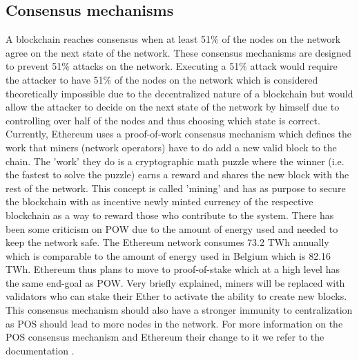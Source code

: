\documentclass[sigconf]{acmart}
\begin{document}
\subsection{Consensus mechanisms}
A blockchain reaches consensus when at least 51\% of the nodes on the network agree on the next state of the network. These consensus mechanisms are designed to prevent 51\% attacks on the network. Executing a 51\% attack would require the attacker to have 51\% of the nodes on the network which is considered theoretically impossible due to the decentralized nature of a blockchain but would allow the attacker to decide on the next state of the network by himself due to controlling over half of the nodes and thus choosing which state is correct. Currently, Ethereum uses a proof-of-work consensus mechanism which defines the work that miners (network operators) have to do add a new valid block to the chain. The 'work' they do is a cryptographic math puzzle where the winner (i.e. the fastest to solve the puzzle) earns a reward and shares the new block with the rest of the network. This concept is called 'mining' and has as purpose to secure the blockchain with as incentive newly minted currency of the respective blockchain as a way to reward those who contribute to the system. There has been some criticism on POW due to the amount of energy used and needed to keep the network safe. The Ethereum network consumes 73.2 TWh annually which is comparable to the amount of energy used in Belgium which is 82.16 TWh. Ethereum thus plans to move to proof-of-stake which at a high level has the same end-goal as POW. Very briefly explained, miners will be replaced with validators who can stake their Ether to activate the ability to create new blocks. This consensus mechanism should also have a stronger immunity to centralization as POS should lead to more nodes in the network. For more information on the POS consensus mechanism and Ethereum their change to it we refer to the documentation \cite{ethereum}  \cite{white_paper}.
\end{document}
